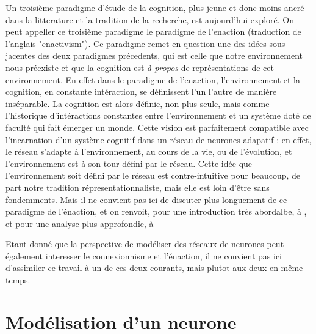\documentclass[12pt]{scrartcl}
\begin{document}
Un troisième paradigme d'étude de la cognition, plus jeune et donc moins ancré dans la litterature et la tradition de la recherche, est aujourd'hui exploré. On peut appeller ce troisième paradigme le paradigme de l'enaction (traduction de l'anglais "enactivism"). Ce paradigme remet en question une des idées sous-jacentes des deux paradigmes précedents, qui est celle que notre environnement nous préexiste et que la cognition est \textit{à propos} de représentations de cet environnement. En effet dans le paradigme de l'enaction, l'environnement et la cognition, en constante intéraction, se définissent l'un l'autre de manière inséparable. La cognition est alors définie, non plus seule, mais comme l'historique d'intéractions constantes entre l'environnement et un système doté de faculté qui fait émerger un monde. Cette vision est parfaitement compatible avec l'incarnation d'un système cognitif dans un réseau de neurones adapatif : en effet, le réseau s'adapte à l'environnement, au cours de la vie, ou de l'évolution, et l'environnement est à son tour défini par le réseau. Cette idée que l'environnement soit défini par le réseau est contre-intuitive pour beaucoup, de part notre tradition répresentationnaliste, mais elle est loin d'être sans fondemments. Mais il ne convient pas ici de discuter plus longuement de ce paradigme de l'énaction, et on renvoit, pour une introduction très abordalbe, à \cite{Varelacarto}, et pour une analyse plus approfondie, à \cite{treeofknowledge}

Etant donné que la perspective de modéliser des réseaux de neurones peut également interesser le connexionnisme et l'énaction, il ne convient pas ici d'assimiler ce travail à un de ces deux courants, mais plutot aux deux en même temps. 


\pagebreak

\part{Modélisation d'un neurone}
\end{document}
